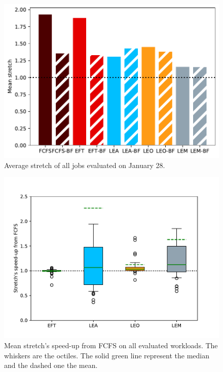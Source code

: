 \documentclass[conference,10pt]{IEEEtran}
\begin{document}
\begin{figure}[tb]\centering\includegraphics[scale=0.47]{../MBSS/plot/BF_AND_NON_BF_Results_FCFS_Score_Backfill_2022-01-28->2022-01-28_V10000_Mean_Stretch_450_128_32_256_4_1024.pdf}\caption{Average stretch of all jobs evaluated on January 28.}\end{figure}
\begin{figure}\centering\includegraphics[scale=0.47]{../MBSS/plot/Boxplot/box_plot_mean_stretch_all_workloads.pdf}\caption{Mean stretch's speed-up from FCFS on all evaluated workloads. The whiskers are the octiles. The solid green line represent the median and the dashed one the mean.}\label{boxplot.all}\end{figure}
\end{document}
